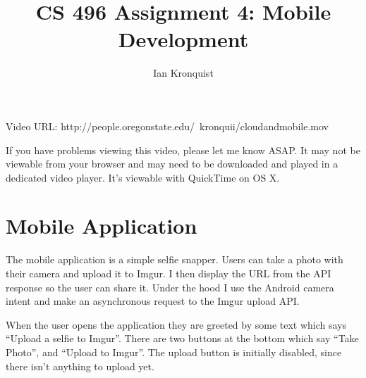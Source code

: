 \documentclass[12pt]{article}
\title{CS 496 Assignment 4: Mobile Development}
\author{Ian Kronquist}
\begin{document}
\maketitle

Video URL: http://people.oregonstate.edu/~kronquii/cloudandmobile.mov


If you have problems viewing this video, please let me know ASAP. It may not be viewable from your browser and may need to be downloaded and played in a dedicated video player. It's viewable with QuickTime on OS X.

\section{Mobile Application}
The mobile application is a simple selfie snapper. Users can take a photo with their camera and upload it to Imgur. I then display the URL from the API response so the user can share it. Under the hood I use the Android camera intent and make an asynchronous request to the Imgur upload API.

When the user opens the application they are greeted by some text which says ``Upload a selfie to Imgur''. There are two buttons at the bottom which say ``Take Photo'', and ``Upload to Imgur''. The upload button is initially disabled, since there isn't anything to upload yet.
\end{document}
